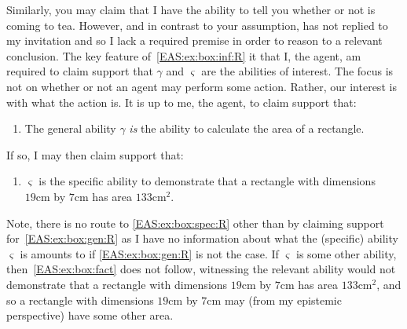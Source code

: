 \begin{note}
{    Similarly, you may claim that I have the ability to tell you whether or not  is coming to tea.
    However, and in contrast to your assumption,  has not replied to my invitation and so I lack a required premise in order to reason to a relevant conclusion.
  }
  The key feature of~\ref{EAS:ex:box:inf:R} it that I, the agent, am required to claim support that \(\gamma\) and \(\varsigma\) are the abilities of interest.
  The focus is not on whether or not an agent may perform some action.
  Rather, our interest is with what the action is.
  It is up to me, the agent, to claim support that:
  \begin{enumerate}[label=\emph{A}\arabic*., ref=(\emph{A}\arabic*), resume*=EAS_counter]
  \item\label{EAS:ex:box:gen:R} The general ability \(\gamma\) \emph{is} the ability to calculate the area of a rectangle.
  \end{enumerate}
  If so, I may then claim support that:
  \begin{enumerate}[label=\emph{A}\arabic*., ref=(\emph{A}\arabic*), resume*=EAS_counter]
  \item\label{EAS:ex:box:spec:R} \(\varsigma\) is the specific ability to demonstrate that a rectangle with dimensions \(19\text{cm}\) by \(7\text{cm}\) has area \(133\text{cm}^{2}\).
  \end{enumerate}
  Note, there is no route to \ref{EAS:ex:box:spec:R} other than by claiming support for~\ref{EAS:ex:box:gen:R} as I have no information about what the (specific) ability \(\varsigma\) is amounts to if \ref{EAS:ex:box:gen:R} is not the case.
  If \(\varsigma\) is some other ability, then~\ref{EAS:ex:box:fact} does not follow, witnessing the relevant ability would not demonstrate that a rectangle with
  dimensions \(19\text{cm}\) by \(7\text{cm}\) has area \(133\text{cm}^{2}\), and so a rectangle with dimensions \(19\text{cm}\) by \(7\text{cm}\) may (from my epistemic perspective) have some other area.
\end{note}

